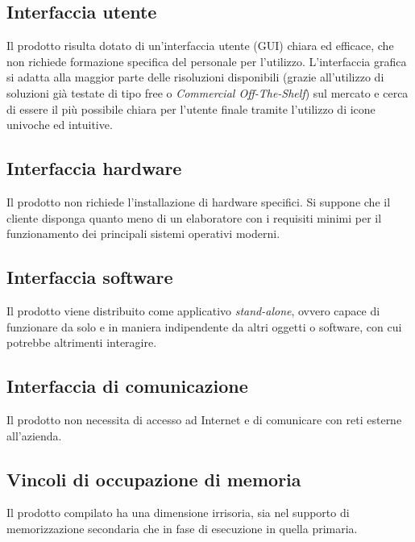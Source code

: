 \documentclass{scrreprt}
\begin{document}
	\subsection{Interfaccia utente}
	Il prodotto risulta dotato di un'interfaccia utente (GUI) chiara ed efficace, che non richiede formazione specifica del personale per l'utilizzo. L'interfaccia grafica si adatta alla maggior parte delle risoluzioni disponibili (grazie all'utilizzo di soluzioni già testate di tipo free o \textit{Commercial Off-The-Shelf}) sul mercato e cerca di essere il più possibile chiara per l'utente finale tramite l'utilizzo di icone univoche ed intuitive.

	\subsection{Interfaccia hardware}
	Il prodotto non richiede l'installazione di hardware specifici. Si suppone che il cliente disponga quanto meno di un elaboratore con i requisiti minimi per il funzionamento dei principali sistemi operativi moderni.

	\subsection{Interfaccia software}
	Il prodotto viene distribuito come applicativo \textit{stand-alone}, ovvero capace di funzionare da solo e in maniera indipendente da altri oggetti o software, con cui potrebbe altrimenti interagire.

	\subsection{Interfaccia di comunicazione}
	Il prodotto non necessita di accesso ad Internet e di comunicare con reti esterne all'azienda.

	\subsection{Vincoli di occupazione di memoria}
	Il prodotto compilato ha una dimensione irrisoria, sia nel supporto di memorizzazione secondaria che in fase di esecuzione in quella primaria.
\end{document}
